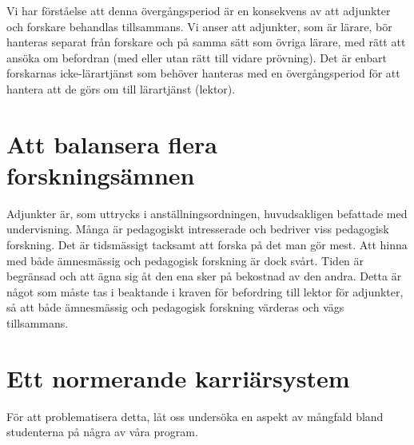 \documentclass[a4paper,oneside,article,swedish]{memoir}
\let\section\chapter
\begin{document}
Vi har förståelse att denna övergångsperiod är en konsekvens av att adjunkter 
och forskare behandlas tillsammans.
Vi anser att adjunkter, som är lärare, bör hanteras separat från forskare och 
på samma sätt som övriga lärare, med rätt att ansöka om befordran (med eller 
utan rätt till vidare prövning).
Det är enbart forskarnas icke-lärartjänst som behöver hanteras med en 
övergångsperiod för att hantera att de görs om till lärartjänst (lektor).


\section{Att balansera flera forskningsämnen}

Adjunkter är, som uttrycks i
anställningsordningen\autocite[avsnitt 1.5, ss.~20]{Anställningsordning},
huvudsakligen befattade med undervisning.
Många är pedagogiskt intresserade och bedriver viss pedagogisk forskning.
Det är tidsmässigt tacksamt att forska på det man gör mest.
Att hinna med både ämnesmässig och pedagogisk forskning är dock svårt.
Tiden är begränsad och att ägna sig åt den ena sker på bekostnad av den andra.
Detta är något som måste tas i beaktande i kraven för befordring till lektor 
för adjunkter, så att både ämnesmässig och pedagogisk forskning värderas och 
vägs tillsammans.


\section{Ett normerande karriärsystem}

För att problematisera detta,
låt oss undersöka en aspekt av mångfald bland studenterna på några av våra 
program.
\end{document}
